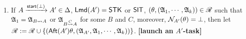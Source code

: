 \smallskip
\fbox
{
\begin{minipage}{\textwidth}
{\small
\begin{enumerate}
    \item If $A \xrightarrow{{\mathsf{start} }(\bot)}A' \in\Delta$, ${\sf Lmd}(A')=\mathsf{STK}$ or ${\sf SIT}$, $(\theta, ({\mathfrak{A} }_1,\cdots,{\mathfrak{A} }_k)) \in \mathscr{R}$ such that 
    ${\mathfrak{A} }_1 = {\mathfrak{A} }_{B \rightsquigarrow A}$ or ${\mathfrak{A} }_{B \stackrel{C}{\rightsquigarrow} A}$ for some $B$ and $C$,
    moreover, $\mathcal{N}_{A'}(\theta) = \bot$,
    then let $\mathscr{R}: = \mathscr{R} \cup \{({\sf Aft}(A')\theta, ({\mathfrak{A} }_{A'},{\mathfrak{A} }_1,\cdots,{\mathfrak{A} }_k))\}$.
        \textbf{[launch an $A'$-task]}


\end{enumerate}}
\end{minipage}}
